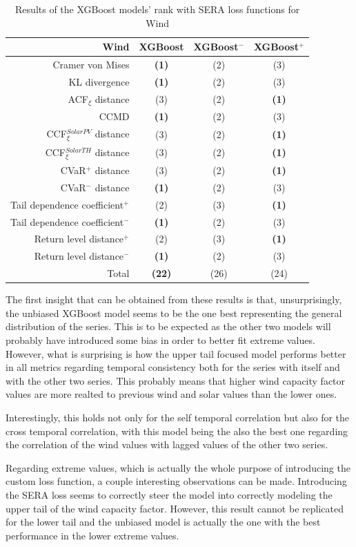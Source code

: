 \begin{table}[ht]
    \centering
    \footnotesize
    \begin{tabular}[r]{r|c|cc}
        \toprule
        \textbf{Wind}&XGBoost&XGBoost$^-$&XGBoost$^+$ \\
        \midrule            
        Cramer von Mises&\textbf{(1)}&(2)&(3) \\
        KL divergence&\textbf{(1)}&(2)&(3) \\
        ACF$_\xi$ distance&(3)&(2)&\textbf{(1)} \\
        \midrule
        CCMD&\textbf{(1)}&(2)&(3) \\
        CCF$_\xi^{Solar PV}$ distance&(3)&(2)&\textbf{(1)} \\
        CCF$_\xi^{Solar TH}$ distance&(3)&(2)&\textbf{(1)} \\
        \midrule
        CVaR$^+$ distance&(3)&(2)&\textbf{(1)} \\
        CVaR$^-$ distance&\textbf{(1)}&(2)&(3) \\
        Tail dependence coefficient$^+$&(2)&(3)&\textbf{(1)} \\
        Tail dependence coefficient$^-$&\textbf{(1)}&(2)&(3) \\
        Return level distance$^+$&(2)&(3)&\textbf{(1)} \\
        Return level distance$^-$&\textbf{(1)}&(2)&(3) \\
        \bottomrule
        Total&\textbf{(22)}&(26)&(24) \\
        \bottomrule
    \end{tabular}
    \caption{Results of the XGBoost models' rank with SERA loss functions for Wind\label{long}}
    \label{table:results-rank-custom-loss}
\end{table}

The first insight that can be obtained from these results is that, unsurprisingly, the unbiased XGBoost model seems to be the one best representing the general distribution of the series. This is to be expected as the other two models will probably have introduced some bias in order to better fit extreme values. However, what is surprising is how the upper tail focused model performs better in all metrics regarding temporal consistency both for the series with itself and with the other two series. This probably means that higher wind capacity factor values are more realted to previous wind and solar values than the lower ones. 

Interestingly, this holds not only for the self temporal correlation but also for the cross temporal correlation, with this model being the also the best one regarding the correlation of the wind values with lagged values of the other two series. 

Regarding extreme values, which is actually the whole purpose of introducing the custom loss function, a couple interesting observations can be made. Introducing the SERA loss seems to correctly steer the model into correctly modeling the upper tail of the wind capacity factor. However, this result cannot be replicated for the lower tail and the unbiased model is actually the one with the best performance in the lower extreme values. 